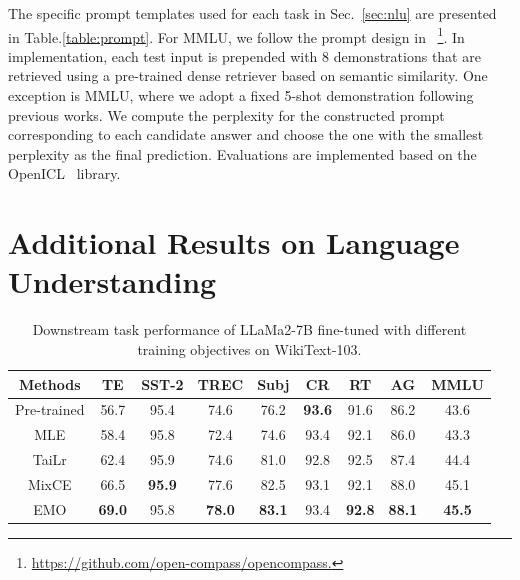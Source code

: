 The specific prompt templates used for each task in Sec.~\ref{sec:nlu} are presented in Table.\ref{table:prompt}. For MMLU, we follow the prompt design in \cite{2023opencompass}~\footnote{\url{https://github.com/open-compass/opencompass.}}. In implementation, each test input is prepended with 8 demonstrations that are retrieved using a pre-trained dense retriever based on semantic similarity. One exception is MMLU, where we adopt a fixed 5-shot demonstration following previous works. We compute the perplexity for the constructed prompt corresponding to each 
candidate answer and choose the one with the smallest perplexity as the final prediction.
Evaluations are implemented based on the OpenICL~\citep{wu-etal-2023-openicl} library.

\section{Additional Results on Language Understanding}
\label{appendix:a3}
\begin{table}[h!]
    \centering
    \small
    \begin{tabular}{ccccccccc}
    \toprule
    \textbf{Methods} & \textbf{TE} & \textbf{SST-2} & \textbf{TREC} & \textbf{Subj} & \textbf{CR}   & \textbf{RT} & \textbf{AG} & \textbf{MMLU} \\
    \midrule
    Pre-trained      &  56.7                   &95.4            &74.6           &76.2           &\textbf{93.6}           & 91.6                     & 86.2              & 43.6          \\
    MLE              & 58.4                    & 95.8           &72.4           & 74.6          & 93.4          &  92.1                    &  86.0             & 43.3          \\
    TaiLr            &  62.4                  & 95.9          & 74.6          &  81.0         &92.8           &  92.5                    & 87.4              &44.4           \\
    MixCE            &  66.5                   & \textbf{95.9}           & 77.6          &82.5  &93.1           & 92.1                     &  88.0            &  45.1         \\
    \midrule
    EMO             & \textbf{69.0}           &95.8   &\textbf{78.0}  &\textbf{83.1}           &93.4  &\textbf{92.8}                      &\textbf{88.1}      & \textbf{45.5}          \\
    \bottomrule
    \end{tabular}
    \caption{Downstream task performance of LLaMa2-7B fine-tuned with different training objectives on WikiText-103.}
    \label{table:llama2-7b}
\end{table}
